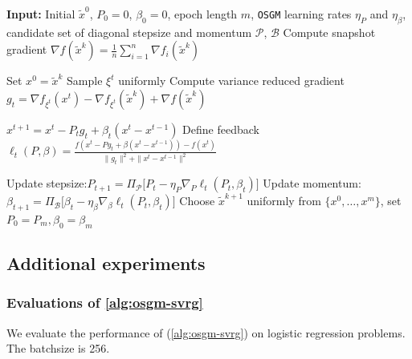 \documentclass{article}
\theoremstyle{definition}
\DeclareRobustCommand{\namerefc}[2]{\hyperref[#2]{\textcolor{#1}{\nameref*{#2}}}}
\newcommand{\ov}{\namerefc{purple}{alg:osgm-svrg}}
\newcommand{\os}{\texttt{OSGM}}
\newcommand{\ovh}{\texttt{OSGM-SVRG}}
\begin{document}
\begin{algorithm}[ht!]
\caption{Practical {\ovh}}
\label{alg:prac-osgm-vr}
\begin{algorithmic}[1]
\STATE \textbf{Input:} Initial $\tilde{x}^0$, $P_0=0$, $\beta_0=0$, epoch length $m$, {\os} learning rates $\eta_P$ and $\eta_{\beta}$, candidate set of diagonal stepsize and momentum $\mathcal{P}$, $\mathcal{B}$
    \STATE Compute snapshot gradient $\nabla f(\tilde{x}^k) = \tfrac1n\sum_{i=1}^n \nabla f_i(\tilde{x}^k)$
    
    \STATE Set $x^0 = \tilde{x}^k$
        \STATE Sample $\xi^t$ uniformly
        \STATE Compute variance reduced gradient
        $
            g_t = \nabla f_{\xi^t}(x^t) - \nabla f_{\xi^t}(\tilde{x}^k) + \nabla f(\tilde{x}^k)
        $
        \vspace{0.1cm}
        
        \STATE 
        $
            x^{t+1}
            =
            x^t
            - P_t g_t
            + \beta_t (x^t - x^{t-1})
        $
        \STATE Define feedback $\ell_t (P,\beta) = \tfrac{f(x^t - P g_t + \beta (x^t - x^{t-1})) - f(x^t)}{\|g_t\|^2 + \|x^t - x^{t-1}\|^2}$

        \STATE Update stepsize:\qquad $P_{t+1} = \Pi_{\mathcal{P}}\big[P_{t} - \eta_P \nabla_P \ell_t (P_t,\beta_t) \big]$
        \vspace{0.1cm}
        \STATE Update momentum: $\beta_{t+1} = \Pi_{\mathcal{B}} \big[ \beta_{t} - \eta_{\beta} \nabla_{\beta} \ell_t (P_t,\beta_t) \big]$
        \vspace{0.1cm}
    \ENDFOR
    \STATE Choose $\tilde{x}^{k+1}$ uniformly from $\{x^0,\dots,x^m\}$, set $P_0=P_m, \beta_0=\beta_m$
\ENDFOR
\end{algorithmic}
\end{algorithm}




\subsection{Additional experiments}

\subsubsection{Evaluations of \cref{alg:osgm-svrg}}\label{app:exp-fig}

We evaluate the performance of {\ov} (\cref{alg:osgm-svrg}) on logistic regression problems. The batchsize is 256.
\end{document}
